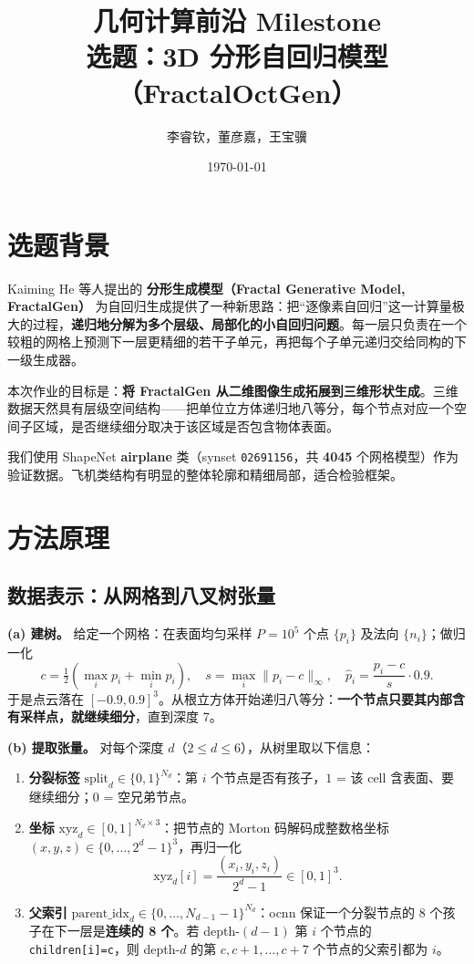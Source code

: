 \documentclass[11pt]{ctexart}
\title{\textbf{几何计算前沿 Milestone}\\[4pt]
       \large 选题：3D 分形自回归模型（FractalOctGen）}
\author{李睿钦，董彦嘉，王宝骥}
\date{\today}
\newcommand{\code}[1]{\texttt{#1}}
\begin{document}
\maketitle

\section{选题背景}

Kaiming He 等人提出的 \textbf{分形生成模型（Fractal Generative Model, FractalGen）} 为自回归生成提供了一种新思路：把“逐像素自回归”这一计算量极大的过程，\textbf{递归地分解为多个层级、局部化的小自回归问题}。每一层只负责在一个较粗的网格上预测下一层更精细的若干子单元，再把每个子单元递归交给同构的下一级生成器。

本次作业的目标是：\textbf{将 FractalGen 从二维图像生成拓展到三维形状生成}。三维数据天然具有层级空间结构——把单位立方体递归地八等分，每个节点对应一个空间子区域，是否继续细分取决于该区域是否包含物体表面。

我们使用 ShapeNet \textbf{airplane} 类（synset \code{02691156}，共 \textbf{4045} 个网格模型）作为验证数据。飞机类结构有明显的整体轮廓和精细局部，适合检验框架。

\section{方法原理}

\subsection{数据表示：从网格到八叉树张量}

\textbf{(a) 建树。} 给定一个网格：在表面均匀采样 $P=10^5$ 个点 $\{p_i\}$ 及法向 $\{n_i\}$；做归一化
\[
c=\tfrac{1}{2}(\max_i p_i+\min_i p_i),\quad
s=\max_i\|p_i-c\|_\infty,\quad
\hat p_i=\frac{p_i-c}{s}\cdot 0.9 .
\]
于是点云落在 $[-0.9,0.9]^3$。从根立方体开始递归八等分：\textbf{一个节点只要其内部含有采样点，就继续细分}，直到深度 7。

\textbf{(b) 提取张量。} 对每个深度 $d$（$2\le d\le 6$），从树里取以下信息：

\begin{enumerate}[leftmargin=*]
\item \textbf{分裂标签} $\mathrm{split}_d\in\{0,1\}^{N_d}$：第 $i$ 个节点是否有孩子，$1$ = 该 cell 含表面、要继续细分；$0$ = 空兄弟节点。
\item \textbf{坐标} $\mathrm{xyz}_d\in[0,1]^{N_d\times 3}$：把节点的 Morton 码解码成整数格坐标 $(x,y,z)\in\{0,\dots,2^d-1\}^3$，再归一化
  \[\mathrm{xyz}_d[i]=\frac{(x_i,y_i,z_i)}{2^d-1}\in[0,1]^3.\]
\item \textbf{父索引} $\mathrm{parent\_idx}_d\in\{0,\dots,N_{d-1}-1\}^{N_d}$：ocnn 保证一个分裂节点的 8 个孩子在下一层是\textbf{连续的 8 个}。若 depth-$(d{-}1)$ 第 $i$ 个节点的 \code{children[i]=c}，则 depth-$d$ 的第 $c,c{+}1,\dots,c{+}7$ 个节点的父索引都为 $i$。
\end{enumerate}
\end{document}
